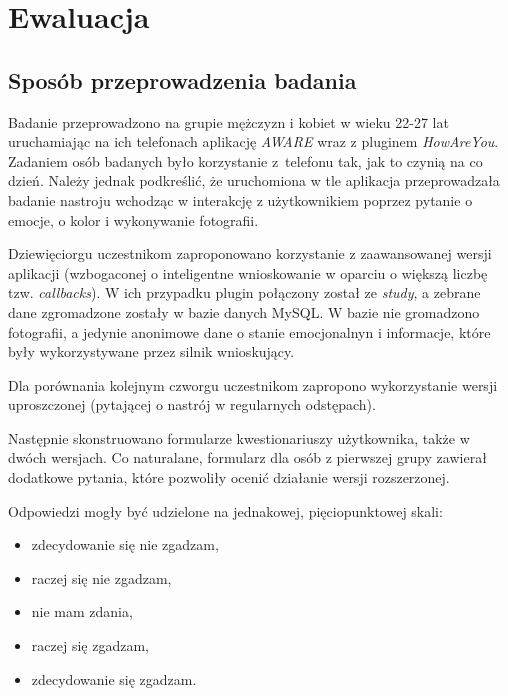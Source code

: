 \chapter{Ewaluacja}
\label{cha:ewaluacja}


\section{Sposób przeprowadzenia badania}
\label{sec:sposobPrzeprowadzeniaBadania}

Badanie przeprowadzono na grupie mężczyzn i kobiet w wieku 22-27 lat uruchamiając na ich telefonach aplikację \textit{AWARE} wraz z pluginem \textit{HowAreYou}. Zadaniem osób badanych było korzystanie z~telefonu tak, jak to czynią na co dzień. Należy jednak podkreślić, że uruchomiona w tle aplikacja przeprowadzała badanie nastroju wchodząc w interakcję z użytkownikiem poprzez pytanie o emocje, o kolor i wykonywanie fotografii.

Dziewięciorgu uczestnikom zaproponowano korzystanie z zaawansowanej wersji aplikacji (wzbogaconej o inteligentne wnioskowanie w oparciu o większą liczbę tzw. \textit{callbacks}). W ich przypadku plugin połączony został ze \textit{study}, a zebrane dane zgromadzone zostały w bazie danych MySQL. W bazie nie gromadzono fotografii, a jedynie anonimowe dane o stanie emocjonalnyn i informacje, które były wykorzystywane przez silnik wnioskujący.

Dla porównania kolejnym czworgu uczestnikom zapropono wykorzystanie wersji uproszczonej (pytającej o nastrój w regularnych odstępach).

Następnie skonstruowano formularze kwestionariuszy użytkownika, także w dwóch wersjach. Co naturalane, formularz dla osób z pierwszej grupy zawierał dodatkowe pytania, które pozwoliły ocenić działanie wersji rozszerzonej.

Odpowiedzi mogły być udzielone na jednakowej, pięciopunktowej skali:
\begin{itemize}
	\item zdecydowanie się nie zgadzam, 
	\item raczej się nie zgadzam,
	\item nie mam zdania,
	\item raczej się zgadzam,
	\item zdecydowanie się zgadzam.
\end{itemize}

